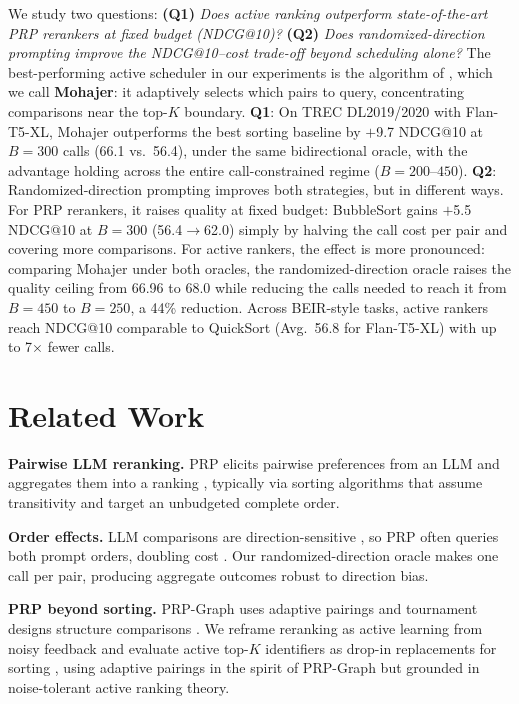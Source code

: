 \documentclass{llmxive}
\begin{document}
We study two questions:
\textbf{(Q1)} \emph{Does active ranking outperform state-of-the-art PRP rerankers at fixed budget (NDCG@10)?}
\textbf{(Q2)} \emph{Does randomized-direction prompting improve the NDCG@10--cost trade-off beyond scheduling alone?}
The best-performing active scheduler in our experiments is the algorithm of \citet{mohajer2017active}, which we call \textbf{Mohajer}: it adaptively selects which pairs to query, concentrating comparisons near the top-$K$ boundary.
\textbf{Q1}: On TREC DL2019/2020 with Flan-T5-XL, Mohajer outperforms the best sorting baseline by $+$9.7 NDCG@10 at $B{=}300$ calls (66.1 vs.\ 56.4), under the same bidirectional oracle, with the advantage holding across the entire call-constrained regime ($B{=}200$--$450$).
\textbf{Q2}: Randomized-direction prompting improves both strategies, but in different ways.
For PRP rerankers, it raises quality at fixed budget: BubbleSort gains $+$5.5 NDCG@10 at $B{=}300$ (56.4$\to$62.0) simply by halving the call cost per pair and covering more comparisons.
For active rankers, the effect is more pronounced: comparing Mohajer under both oracles, the randomized-direction oracle raises the quality ceiling from 66.96 to 68.0 while reducing the calls needed to reach it from $B{=}450$ to $B{=}250$, a 44\% reduction.
Across BEIR-style tasks, active rankers reach NDCG@10 comparable to QuickSort (Avg.\ 56.8 for Flan-T5-XL) with up to 7$\times$ fewer calls.

\section{Related Work}

\noindent\textbf{Pairwise LLM reranking.}
PRP elicits pairwise preferences from an LLM and aggregates them into a ranking \citep{sun2023chatgptsearch,qin2024pairwise}, typically via sorting algorithms that assume transitivity and target an unbudgeted complete order.

\noindent\textbf{Order effects.}
LLM comparisons are direction-sensitive \citep{shi2024judges,yin2025fragile,jeong2025comparativetrap}, so PRP often queries both prompt orders, doubling cost \citep{qin2024pairwise,wu2025realtimeprp}.
Our randomized-direction oracle makes one call per pair, producing aggregate outcomes robust to direction bias.

\noindent\textbf{PRP beyond sorting.}
PRP-Graph uses adaptive pairings \citep{luo-etal-2024-prp} and tournament designs structure comparisons \citep{chen2024tourrank}.
We reframe reranking as active learning from noisy feedback and evaluate active top-$K$ identifiers as drop-in replacements for sorting \citep{heckel2016activeranking,shah2018simplerobust,ren2020bestk,mohajer2017active}, using adaptive pairings in the spirit of PRP-Graph but grounded in noise-tolerant active ranking theory.
\end{document}
